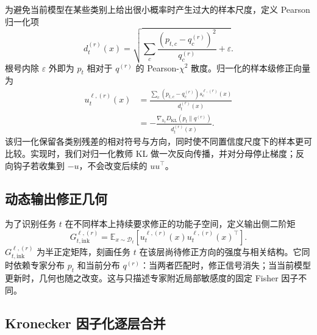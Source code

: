 为避免当前模型在某些类别上给出很小概率时产生过大的样本尺度，定义 Pearson 归一化项
\begin{equation}
  d_t^{(r)}(x)
  =
  \sqrt{
    \sum_c
    \frac{\left(p_{t,c}-q_c^{(r)}\right)^2}{q_c^{(r)}}
    +\varepsilon
  }.
  \label{eq:ink-pearson-normalizer}
\end{equation}
根号内除 $\varepsilon$ 外即为 $p_t$ 相对于 $q^{(r)}$ 的 Pearson-$\chi^2$ 散度。归一化的样本级修正向量为
\begin{align}
  u_t^{\ell,(r)}(x)
  &=
  \frac{
    \sum_c\left(p_{t,c}-q_c^{(r)}\right)
    s_c^{\ell,(r)}(x)
  }{d_t^{(r)}(x)} \\
  &=
  -\frac{
    \nabla_{h_\ell}D_{\mathrm{KL}}(p_t\|q^{(r)})
  }{d_t^{(r)}(x)}.
  \label{eq:ink-layer-correction}
\end{align}
该归一化保留各类别残差的相对符号与方向，同时使不同置信度尺度下的样本更可比较。实现时，我们对归一化教师 KL 做一次反向传播，并对分母停止梯度；反向钩子若收集到 $-u$，不会改变后续的 $uu^\top$。

\subsection{动态输出修正几何}

为了识别任务 $t$ 在不同样本上持续要求修正的功能子空间，定义输出侧二阶矩
\begin{equation}
  \boxed{
  G_{t,\mathrm{ink}}^{\ell,(r)}
  =
  \mathbb E_{x\sim\mathcal D_t}
  \left[
    u_t^{\ell,(r)}(x)u_t^{\ell,(r)}(x)^\top
  \right]
  }.
  \label{eq:ink-output-geometry}
\end{equation}
$G_{t,\mathrm{ink}}^{\ell,(r)}$ 为半正定矩阵，刻画任务 $t$ 在该层尚待修正方向的强度与相关结构。它同时依赖专家分布 $p_t$ 和当前分布 $q^{(r)}$：当两者匹配时，修正信号消失；当当前模型更新时，几何也随之改变。这与只描述专家附近局部敏感度的固定 Fisher 因子不同。

\subsection{Kronecker 因子化逐层合并}
\label{sec:ink-kronecker-merging}

